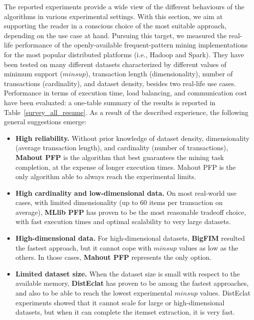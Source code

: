 The reported experiments provide a wide view of the different behaviours of the
algorithms in various experimental settings.
With this section, we aim at supporting the reader
in a conscious choice of the most suitable approach,
depending on the use case at hand.
Pursuing this target, we measured the real-life performance
of the openly-available frequent-pattern mining implementations
for the most popular distributed platforms (i.e., Hadoop and Spark).
They have been tested on many different datasets
characterized by different values of
minimum support ($minsup$),
transaction length (dimensionality),
number of transactions (cardinality),
and dataset density,
besides two real-life use cases.
Performance in terms of execution time, load balancing, and communication cost
have been evaluated:
a one-table summary of the results is reported in Table~\ref{survey_all_resume}.
As a result of the described experience,
the following general suggestions emerge:

\begin{itemize}
 \item {\bf High reliability.}
 Without prior knowledge of dataset density, dimensionality
 (average transaction length), and cardinality (number of transactions),
 \textbf{Mahout PFP} is the algorithm that best guarantees
 the mining task completion,
 at the expense of longer execution times.
 Mahout PFP is the only algorithm able to always reach the experimental limits.


 \item {\bf High cardinality and low-dimensional data.}
 On most real-world use cases, with limited dimensionality
 (up to 60 items per transaction on average), \textbf{MLlib PFP}
 has proven to be the most reasonable tradeoff choice,
 with fast execution times and optimal scalability to very large datasets.

 \item {\bf High-dimensional data.}
 For high-dimensional datasets, \textbf{BigFIM} resulted
 the fastest approach, but it cannot cope with $minsup$ values as low as the others. In those cases, \textbf{Mahout PFP} represents the only option.

 \item {\bf Limited dataset size.}
 When the dataset size is small with respect to the available memory,
 \textbf{DistEclat} has proven to be among the fastest approaches,
 and also to be able to reach the lowest experimental $minsup$ values.
 DistEclat experiments showed that it cannot scale for large or
 high-dimensional datasets, but when it can complete the itemset extraction,
 it is very fast.

\end{itemize}

